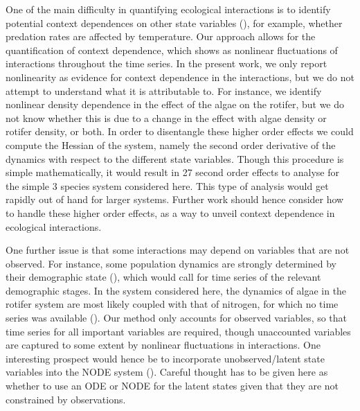 \documentclass[11pt, oneside]{article}
\begin{document}
One of the main difficulty in quantifying ecological interactions is to identify potential context dependences on other state variables (\cite{Song2021}), for example, whether predation rates are affected by temperature.
Our approach allows for the quantification of context dependence, which shows as nonlinear fluctuations of interactions throughout the time series.
In the present work, we only report nonlinearity as evidence for context dependence in the interactions, but we do not attempt to understand what it is attributable to.
For instance, we identify nonlinear density dependence in the effect of the algae on the rotifer, but we do not know whether this is due to a change in the effect with algae density or rotifer density, or both. 
In order to disentangle these higher order effects we could compute the Hessian of the system, namely the second order derivative of the dynamics with respect to the different state variables. 
Though this procedure is simple mathematically, it would result in 27 second order effects to analyse for the simple 3 species system considered here.
This type of analysis would get rapidly out of hand for larger systems.
Further work should hence consider how to handle these higher order effects, as a way to unveil context dependence in ecological interactions. 

One further issue is that some interactions may depend on variables that are not observed.
For instance, some population dynamics are strongly determined by their demographic state (\cite{Lande2002,Coulson2004}), which would call for time series of the relevant demographic stages.
In the system considered here, the dynamics of algae in the rotifer system are most likely coupled with that of nitrogen, for which no time series was available (\cite{Hiltunen2013}).
Our method only accounts for observed variables, so that time series for all important variables are required, though unaccounted variables are captured to some extent by nonlinear fluctuations in interactions.
One interesting prospect would hence be to incorporate unobserved/latent state variables into the NODE system (\cite{Dupont2019,Zhang2019,Frank2022}).
Careful thought has to be given here as whether to use an ODE or NODE for the latent states given that they are not constrained by observations. 
\end{document}
